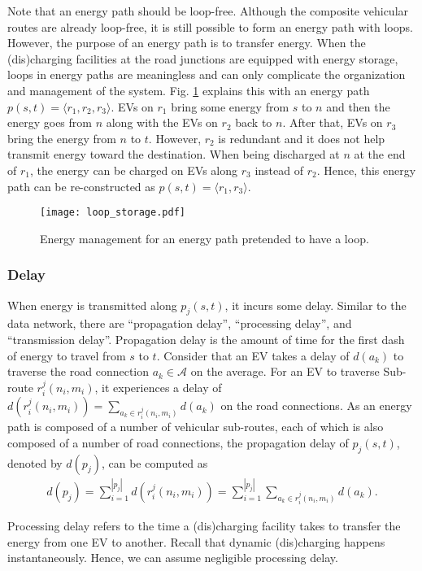 \documentclass[journal]{IEEEtran}
\begin{document}
Note that an energy path should be loop-free. Although the composite vehicular routes are already loop-free, it is still possible to form an energy path with loops. However, the purpose of an energy path is to transfer energy. When the (dis)charging facilities at the road junctions are equipped with energy storage, loops in energy paths are meaningless and can only complicate  the organization and management of the system. Fig. \ref{fig:loop_storage} explains this with an energy path $p(s,t)=\langle r_1, r_2, r_3\rangle$. EVs on $r_1$ bring some energy from $s$ to $n$ and then the energy goes from $n$ along with the EVs on $r_2$ back to $n$. After that, EVs on $r_3$ bring the energy from $n$ to $t$. However, $r_2$ is redundant and it does not help transmit energy toward the destination. When being discharged at $n$ at the end of $r_1$, the energy can be charged on EVs along $r_3$ instead of $r_2$. Hence, this energy path can be re-constructed as $p(s,t)=\langle r_1, r_3\rangle$.

\begin{figure}[!t]
\centering
\texttt{[image: loop\_storage.pdf]}
\caption{Energy management for an energy path pretended to have a loop.}
\label{fig:loop_storage}
\end{figure}


\subsubsection{Delay}
When energy is transmitted along $p_j(s,t)$, it incurs some delay. Similar to the data network, there are ``propagation delay'', ``processing delay'', and ``transmission delay''. Propagation delay is the amount of time for the first dash of energy to travel from $s$ to $t$. Consider that an EV takes a delay of $d(a_k)$ to traverse the road connection $a_k\in \mathcal{A}$ on the average. For an EV to traverse Sub-route $r_i^j(n_i,m_i)$, it experiences a delay of $d(r_i^j(n_i,m_i))=\sum_{a_k\in r_i^j(n_i,m_i)}{d(a_k)}$ on the road connections. As an energy path is composed of a number of vehicular sub-routes, each of which is also composed of a number of road connections, the propagation delay of $p_j(s,t)$, denoted by $d(p_j)$, can be computed as 
\begin{align}
	d(p_j) = \sum_{i=1}^{|p_j|}{d(r_i^j(n_i,m_i))} = \sum_{i=1}^{|p_j|} \sum_{a_k\in r_i^j(n_i,m_i)}{d(a_k)}.
\end{align}

Processing delay refers to the time a (dis)charging facility takes to transfer the energy from one EV to another. Recall that dynamic (dis)charging happens instantaneously. Hence, we can assume negligible processing delay.
\end{document}
